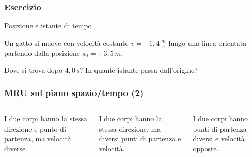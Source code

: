 \documentclass[]{beamer}
\theoremstyle{plain}
\begin{document}
\begin{frame}
\frametitle{Esercizio}
\begin{exampleblock}{Posizione e istante di tempo}
  \small{Un gatto si muove con velocità costante $ v = - 1,4 \, \frac{m}{s} $ lungo una linea orientata partendo dalla posizione $ s_0 = +3,5 \, m $. 

  Dove si trova dopo $ 4,0 \, s $? In quante istante passa dall'origine?}
\end{exampleblock}
\end{frame}



\begin{frame}
\frametitle{MRU sul piano spazio/tempo (2)}


\begin{columns}
\begin{column}{0.3\textwidth}
\begin{figure}\centering
{}
\end{figure}
{\small I due corpi hanno la stessa direzione e punto di partenza, ma velocità diverse.}
\end{column}
\begin{column}{0.3\textwidth}
\begin{figure}\centering
{}
\end{figure}
{\small I due corpi hanno la stessa direzione, ma diversi punti di partenza e velocità.}
\end{column}
\begin{column}{0.3\textwidth}
\begin{figure}\centering
{}
\end{figure}
{\small I due corpi hanno punti di partenza diversi e velocità opposte.}
\end{column}\end{columns}
\end{frame}
\end{document}
